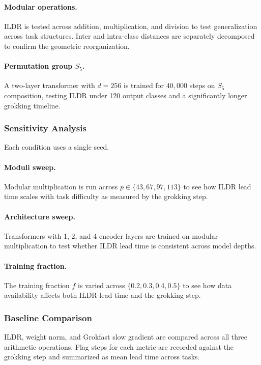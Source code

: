 \documentclass{article}
\begin{document}
\paragraph{Modular operations.}
ILDR is tested across addition, multiplication, and division to test generalization across task structures. Inter and intra-class distances are separately decomposed to confirm the geometric reorganization. 


\paragraph{Permutation group $S_5$.}
A two-layer transformer with $d = 256$ is trained for
$40{,}000$ steps on $S_5$ composition, testing ILDR under 120
output classes and a significantly longer grokking timeline.

\subsubsection{Sensitivity Analysis}

Each condition uses a single seed. 

\paragraph{Moduli sweep.}
\label{sec:moduli}
Modular multiplication is run across $p \in \{43, 67, 97, 113\}$
to see how ILDR lead time scales with task difficulty as
measured by the grokking step.


\paragraph{Architecture sweep.}
Transformers with 1, 2, and 4 encoder layers are trained on
modular multiplication to test whether ILDR lead time is consistent
across model depths.


\paragraph{Training fraction.}
\label{sec:frac}
The training fraction $f$ is varied across
$\{0.2, 0.3, 0.4, 0.5\}$ to see how data availability affects
both ILDR lead time and the grokking step.


\subsubsection{Baseline Comparison}

ILDR, weight norm, and Grokfast slow gradient are compared across all three arithmetic operations.
Flag steps for each metric are recorded against the grokking step and summarized as mean lead time across tasks. 
\end{document}
